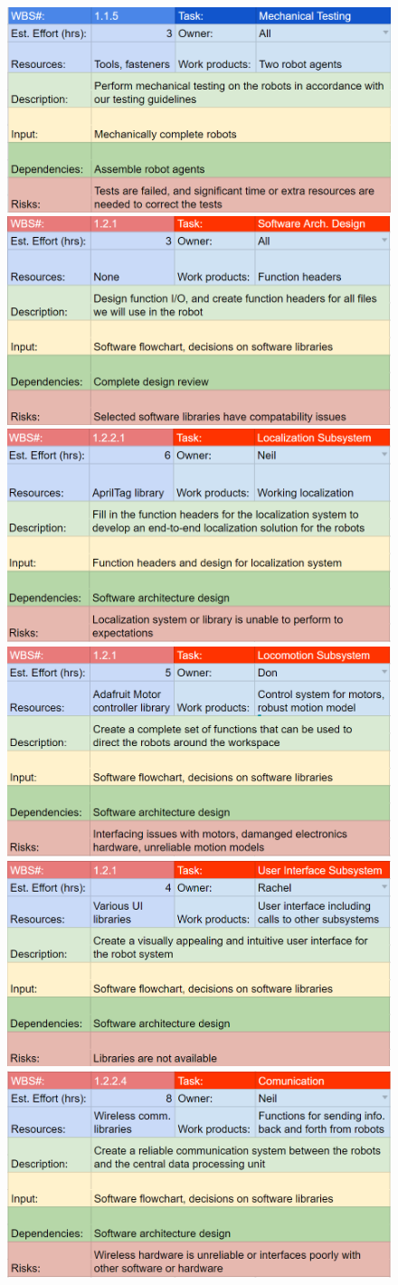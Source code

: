 \begin{figure}[h!]
\includegraphics[width=0.49\columnwidth]{wbs_schedule/wbs_dict_hw7.PNG}
\includegraphics[width=0.49\columnwidth]{wbs_schedule/wbs_dict_sw1.PNG}
\includegraphics[width=0.49\columnwidth]{wbs_schedule/wbs_dict_sw2.PNG}
\includegraphics[width=0.49\columnwidth]{wbs_schedule/wbs_dict_sw3.PNG}
\includegraphics[width=0.49\columnwidth]{wbs_schedule/wbs_dict_sw4.PNG}
\includegraphics[width=0.49\columnwidth]{wbs_schedule/wbs_dict_sw5.PNG}

\end{figure}
